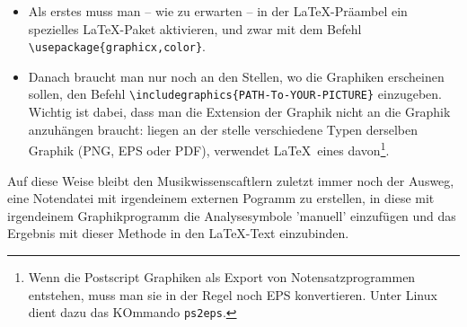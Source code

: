 \begin{itemize}
  \item Als erstes muss man -- wie zu erwarten -- in der \LaTeX-Präambel ein
  spezielles \LaTeX-Paket aktivieren, und zwar mit dem Befehl
  \texttt{\textbackslash{usepackage}\{graphicx,color\}}.
  \item Danach braucht man nur noch an den Stellen, wo die Graphiken erscheinen
  sollen, den Befehl
  \texttt{\textbackslash{includegraphics}\{PATH-To-YOUR-PICTURE\}} einzugeben.
  Wichtig ist dabei, dass man die Extension der Graphik nicht an die Graphik
  anzuhängen braucht: liegen an der stelle verschiedene Typen derselben Graphik
  (PNG, EPS oder PDF), verwendet \LaTeX\ eines davon\footnote{Wenn die Postscript
  Graphiken als Export von Notensatzprogrammen entstehen, muss man sie in der
  Regel noch EPS konvertieren. Unter Linux dient dazu das KOmmando \texttt{ps2eps}.}.
\end{itemize}

Auf diese Weise bleibt den Musikwissenscaftlern zuletzt immer noch der Ausweg,
eine Notendatei mit irgendeinem externen Pogramm zu erstellen, in diese mit
irgendeinem Graphikprogramm die Analysesymbole 'manuell' einzufügen und das
Ergebnis mit dieser Methode in den \LaTeX-Text einzubinden.

% 
